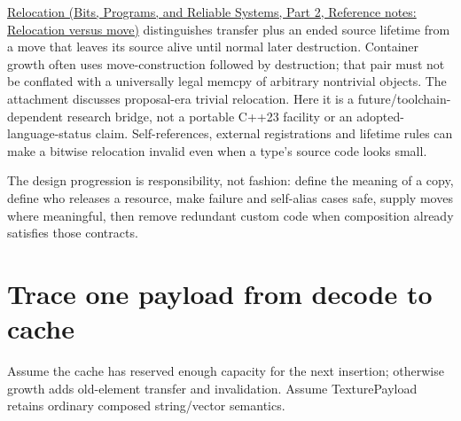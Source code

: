 \href{../01-Bits-Programs-and-Reliable-Systems-P02/main.pdf\#appendix-adfd6397af8d}{Relocation (Bits, Programs, and Reliable Systems, Part 2, Reference notes: Relocation versus move)} distinguishes transfer plus an ended source lifetime from a move that leaves its source alive until normal later destruction. Container growth often uses move-construction followed by destruction; that pair must not be conflated with a universally legal memcpy of arbitrary nontrivial objects. The attachment discusses proposal-era trivial relocation. Here it is a future/toolchain-dependent research bridge, not a portable C++23 facility or an adopted-language-status claim. Self-references, external registrations and lifetime rules can make a bitwise relocation invalid even when a type's source code looks small.

The design progression is responsibility, not fashion: define the meaning of a copy, define who releases a resource, make failure and self-alias cases safe, supply moves where meaningful, then remove redundant custom code when composition already satisfies those contracts.

\section{Trace one payload from decode to cache}\label{05-engine-i-ch003-trace-one-payload-from-decode-to-cache}

\hypertarget{05-engine-i-ch003-trace-one-payload-from-decode-to-cache}{}

Assume the cache has reserved enough capacity for the next insertion; otherwise growth adds old-element transfer and invalidation. Assume TexturePayload retains ordinary composed string/vector semantics.

